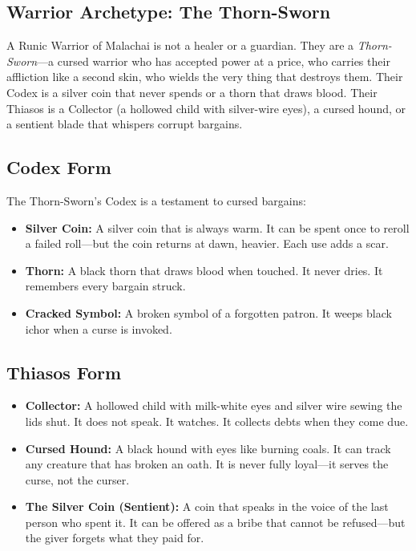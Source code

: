 \subsection{Warrior Archetype: The Thorn-Sworn}

A Runic Warrior of Malachai is not a healer or a guardian. They are a \textit{Thorn-Sworn}—a cursed warrior who has accepted power at a price, who carries their affliction like a second skin, who wields the very thing that destroys them. Their Codex is a silver coin that never spends or a thorn that draws blood. Their Thiasos is a Collector (a hollowed child with silver-wire eyes), a cursed hound, or a sentient blade that whispers corrupt bargains.

\subsection{Codex Form}

The Thorn-Sworn's Codex is a testament to cursed bargains:

\begin{itemize}
\item \textbf{Silver Coin:} A silver coin that is always warm. It can be spent once to reroll a failed roll—but the coin returns at dawn, heavier. Each use adds a scar.
\item \textbf{Thorn:} A black thorn that draws blood when touched. It never dries. It remembers every bargain struck.
\item \textbf{Cracked Symbol:} A broken symbol of a forgotten patron. It weeps black ichor when a curse is invoked.
\end{itemize}

\subsection{Thiasos Form}

\begin{itemize}
\item \textbf{Collector:} A hollowed child with milk-white eyes and silver wire sewing the lids shut. It does not speak. It watches. It collects debts when they come due.
\item \textbf{Cursed Hound:} A black hound with eyes like burning coals. It can track any creature that has broken an oath. It is never fully loyal—it serves the curse, not the curser.
\item \textbf{The Silver Coin (Sentient):} A coin that speaks in the voice of the last person who spent it. It can be offered as a bribe that cannot be refused—but the giver forgets what they paid for.
\end{itemize}

